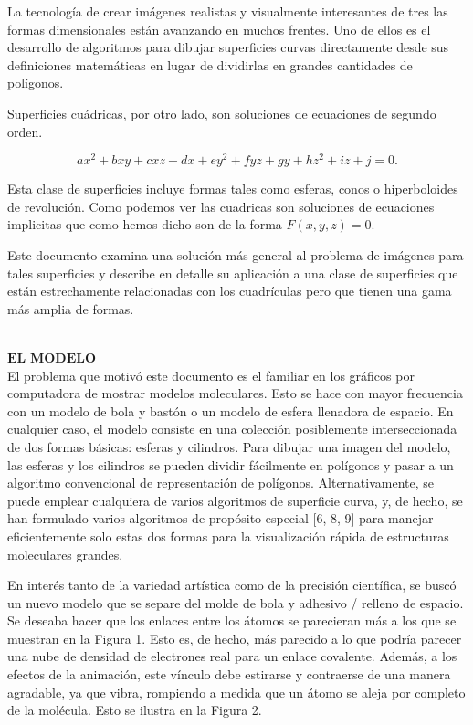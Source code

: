 La tecnología de crear imágenes realistas y visualmente interesantes de tres
las formas dimensionales están avanzando en muchos frentes. Uno de ellos es el desarrollo de algoritmos para dibujar superficies curvas directamente desde sus definiciones matemáticas en lugar de dividirlas en grandes cantidades de polígonos. 

Superficies cuádricas, por otro lado, son soluciones de ecuaciones de segundo orden.

\[
	ax^2 + bxy + cxz +dx +ey^2 +fyz +gy + hz^2 + iz +j = 0.
\]

Esta clase de superficies incluye formas tales como esferas, conos o hiperboloides de revolución. Como podemos ver las cuadricas son soluciones de ecuaciones implicitas que como hemos dicho son de la forma $F(x, y, z) = 0$.

Este documento examina una solución más general al problema de imágenes para tales superficies y describe en detalle su aplicación a una clase de superficies que están estrechamente relacionadas con los cuadrículas pero que tienen una gama más amplia de formas.


${ }$\\
$\textbf{EL MODELO}$
${ }$\\

El problema que motivó este documento es el familiar en los gráficos por computadora de mostrar modelos moleculares. Esto se hace con mayor frecuencia con un modelo de bola y bastón o un modelo de esfera llenadora de espacio. En cualquier caso, el modelo consiste en una colección posiblemente interseccionada de dos formas básicas: esferas y cilindros. Para dibujar una imagen del modelo, las esferas y los cilindros se pueden dividir fácilmente en polígonos y pasar a un algoritmo convencional de representación de polígonos. Alternativamente, se puede emplear cualquiera de varios algoritmos de superficie curva, y, de hecho, se han formulado varios algoritmos de propósito especial [6, 8, 9] para manejar eficientemente solo estas dos formas para la visualización rápida de estructuras moleculares grandes.

En interés tanto de la variedad artística como de la precisión científica, se buscó un nuevo modelo que se separe del molde de bola y adhesivo / relleno de espacio. Se deseaba hacer que los enlaces entre los átomos se parecieran más a los que se muestran en la Figura 1. Esto es, de hecho, más parecido a lo que podría parecer una nube de densidad de electrones real para un enlace covalente. Además, a los efectos de la animación, este vínculo debe estirarse y contraerse de una manera agradable, ya que vibra, rompiendo a medida que un átomo se aleja por completo de la molécula. Esto se ilustra en la Figura 2.

